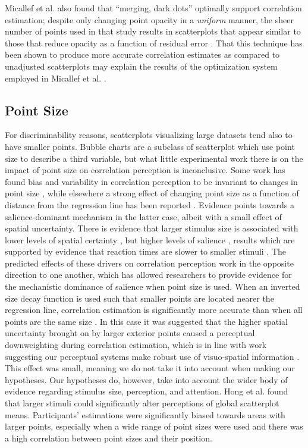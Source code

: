 \documentclass[manuscript, review, anonymous, screen]{acmart}
\begin{document}
Micallef et al. \citep{micallef_2017} also found that ``merging, dark
dots'' optimally support correlation estimation; despite only changing
point opacity in a \emph{uniform} manner, the sheer number of points
used in that study results in scatterplots that appear similar to those
that reduce opacity as a function of residual error \citep{strain_2023}.
That this technique has been shown to produce more accurate correlation
estimates as compared to unadjusted scatterplots may explain the results
of the optimization system employed in Micallef et al.
\citep{micallef_2017}.

\hypertarget{sec-point-size}{%
\subsection{Point Size}\label{sec-point-size}}

For discriminability reasons, scatterplots visualizing large datasets
tend also to have smaller points. Bubble charts are a subclass of
scatterplot which use point size to describe a third variable, but what
little experimental work there is on the impact of point size on
correlation perception is inconclusive. Some work has found bias and
variability in correlation perception to be invariant to changes in
point size \citep{rensink_2012, rensink_2014}, while elsewhere a strong
effect of changing point size as a function of distance from the
regression line has been reported \citep{strain_2023b}. Evidence points
towards a salience-dominant mechanism in the latter case, albeit with a
small effect of spatial uncertainty. There is evidence that larger
stimulus size is associated with lower levels of spatial certainty
\citep{alais_2004}, but higher levels of salience \citep{healey_2011},
results which are supported by evidence that reaction times are slower
to smaller stimuli \citep{gramazio_2014, osaka_1976}. The predicted
effects of these drivers on correlation perception work in the opposite
direction to one another, which has allowed researchers to provide
evidence for the mechanistic dominance of salience when point size is
used. When an inverted size decay function is used such that smaller
points are located nearer the regression line, correlation estimation is
significantly more accurate than when all points are the same size
\citep{strain_2023b}. In this case it was suggested that the higher
spatial uncertainty brought on by larger exterior points caused a
perceptual downweighting during correlation estimation, which is in line
with work suggesting our perceptual systems make robust use of
visuo-spatial information
\citep{strain_2023b, warren_2002, warren_2004}. This effect was small,
meaning we do not take it into account when making our hypotheses. Our
hypotheses do, however, take into account the wider body of evidence
regarding stimulus size, perception, and attention. Hong et al.
\citep{hong_2021} found that larger stimuli could significantly alter
perceptions of global scatterplot means. Participants' estimations were
significantly biased towards areas with larger points, especially when a
wide range of point sizes were used and there was a high correlation
between point sizes and their position.
\end{document}
